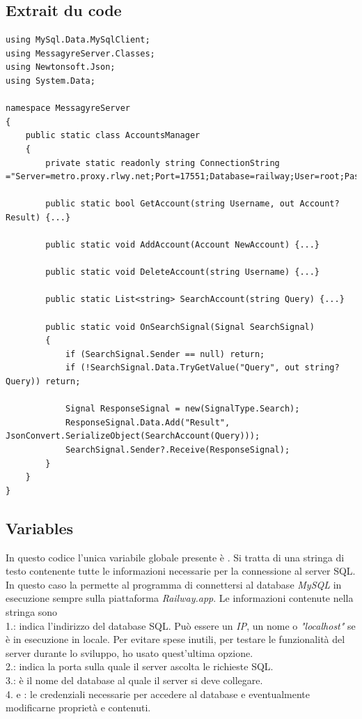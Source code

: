 \documentclass[12pt]{report}
\begin{document}
\subsection{Extrait du code}
\begin{verbatim}
using MySql.Data.MySqlClient;
using MessagyreServer.Classes;
using Newtonsoft.Json;
using System.Data;

namespace MessagyreServer
{
	public static class AccountsManager
	{
		private static readonly string ConnectionString ="Server=metro.proxy.rlwy.net;Port=17551;Database=railway;User=root;Password=uGZBAjgfYSXFTcfJDWySgEVBxjScuDwB;\r\n";
		
		public static bool GetAccount(string Username, out Account? Result) {...}
		
		public static void AddAccount(Account NewAccount) {...}
		
		public static void DeleteAccount(string Username) {...}

		public static List<string> SearchAccount(string Query) {...}
		
		public static void OnSearchSignal(Signal SearchSignal)
		{
			if (SearchSignal.Sender == null) return;
			if (!SearchSignal.Data.TryGetValue("Query", out string? Query)) return;
			
			Signal ResponseSignal = new(SignalType.Search);
			ResponseSignal.Data.Add("Result", JsonConvert.SerializeObject(SearchAccount(Query)));
			SearchSignal.Sender?.Receive(ResponseSignal);
		}
	}
}
\end{verbatim}

\subsection{Variables}
In questo codice l'unica variabile globale presente è . Si tratta di una stringa di testo contenente tutte le informazioni necessarie per la connessione al server SQL. In questo caso la  permette al programma di connettersi al database \textit{MySQL} in esecuzione sempre sulla piattaforma \textit{Railway.app}. Le informazioni contenute nella stringa sono\\ 
1.: indica l'indirizzo del database SQL. Può essere un \textit{IP}, un nome o \textit{"localhost"} se è in esecuzione in locale. Per evitare spese inutili, per testare le funzionalità del server durante lo sviluppo, ho usato quest'ultima opzione.\\
2.: indica la porta sulla quale il server ascolta le richieste SQL.\\ 
3.: è il nome del database al quale il server si deve collegare.\\
4. e : le credenziali necessarie per accedere al database e eventualmente modificarne proprietà e contenuti.
\end{document}
